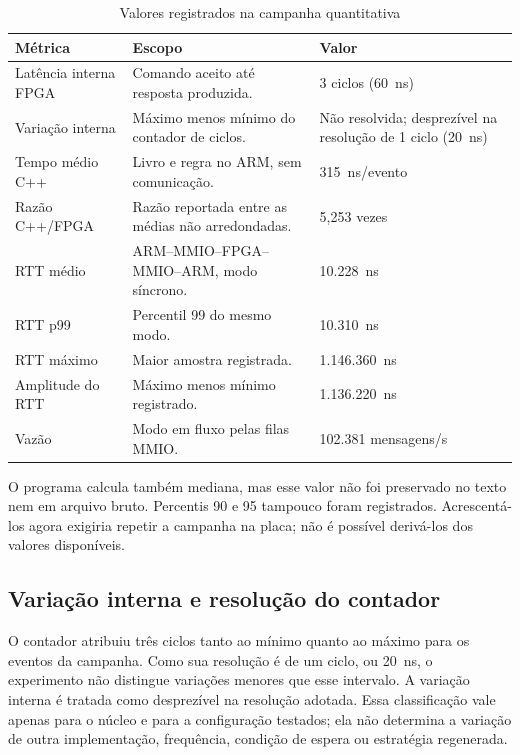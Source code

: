 \begin{table}[htb]
\caption{Valores registrados na campanha quantitativa}
\label{tab:resultadosBenchmark}
\begin{tabularx}{\textwidth}{lXl}
\toprule
\textbf{Métrica} & \textbf{Escopo} & \textbf{Valor} \\ \midrule
Latência interna FPGA & Comando aceito até resposta produzida. & 3 ciclos (60~ns) \\
Variação interna & Máximo menos mínimo do contador de ciclos. & Não resolvida; desprezível na resolução de 1 ciclo (20~ns) \\
Tempo médio C++ & Livro e regra no ARM, sem comunicação. & 315~ns/evento \\
Razão C++/FPGA & Razão reportada entre as médias não arredondadas. & 5,253 vezes \\
RTT médio & ARM--MMIO--FPGA--MMIO--ARM, modo síncrono. & 10.228~ns \\
RTT p99 & Percentil 99 do mesmo modo. & 10.310~ns \\
RTT máximo & Maior amostra registrada. & 1.146.360~ns \\
Amplitude do RTT & Máximo menos mínimo registrado. & 1.136.220~ns \\
Vazão & Modo em fluxo pelas filas MMIO. & 102.381 mensagens/s \\ \bottomrule
\end{tabularx}
\end{table}

O programa calcula também mediana, mas esse valor não foi preservado no texto nem em arquivo bruto. Percentis 90 e 95 tampouco foram registrados. Acrescentá-los agora exigiria repetir a campanha na placa; não é possível derivá-los dos valores disponíveis.

\subsection{Variação interna e resolução do contador}\label{subsec:jitter}

O contador atribuiu três ciclos tanto ao mínimo quanto ao máximo para os eventos da campanha. Como sua resolução é de um ciclo, ou 20~ns, o experimento não distingue variações menores que esse intervalo. A variação interna é tratada como desprezível na resolução adotada. Essa classificação vale apenas para o núcleo e para a configuração testados; ela não determina a variação de outra implementação, frequência, condição de espera ou estratégia regenerada.

